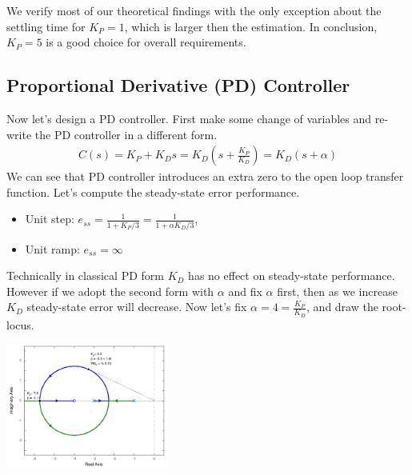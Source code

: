 \documentclass[twoside]{article}
\begin{document}
\vspace{12 pt}

We verify most of our theoretical findings with the only
exception about the settling time for $K_P = 1$, which is
larger then the estimation. In conclusion, $K_P = 5$ is a 
good choice for overall requirements. 

\subsection{Proportional Derivative (PD) Controller}

Now let's design a PD controller. First make some change of
variables and re-write the PD controller in a different form.
%
\begin{align*}
 C(s) = K_P + K_D s = K_D \left( s + \frac{K_P}{K_D} \right) = K_D (s
  + \alpha)
\end{align*}
%
We can see that PD controller introduces an extra zero to the
open loop transfer function. Let's compute the steady-state error performance. 
%
\begin{itemize}
\item Unit step: $e_{ss} = \frac{1}{1 + K_P/ 3} = \frac{1}{1 + \alpha K_D/ 3}$, 
\item Unit ramp: $e_{ss} = \infty$
\end{itemize}
Technically in classical PD form $K_D$ has no effect on steady-state
performance. However if we adopt the second form with $\alpha$
and fix $\alpha$ first, then as we increase $K_D$ steady-state error
will decrease. Now let's fix $\alpha = 4 = \frac{K_P}{K_D}$, and draw 
the root-locus. 

\vspace{12 pt}

  \begin{minipage}[h]{1\linewidth}
    \begin{center}
      \includegraphics[width=0.4\textwidth]{PDlocus}
    \end{center}
  \end{minipage}

\vspace{12 pt}
\end{document}
